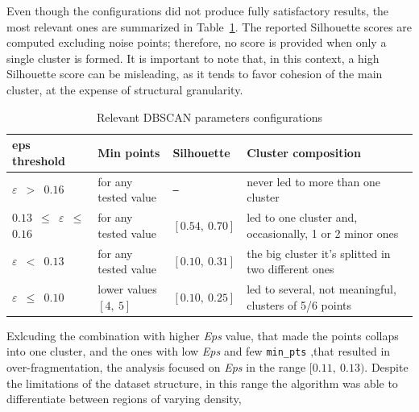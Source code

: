 
Even though the configurations did not produce fully satisfactory results, the most relevant ones are summarized in Table~\ref{tab:eps}. 
The reported Silhouette scores are computed excluding noise points; therefore, no score is provided when only a single cluster is formed. 
It is important to note that, in this context, a high Silhouette score can be misleading, as it tends to favor cohesion of the main cluster, at the expense of structural granularity. 
\begin{table}[h]
\centering
\begin{tabular}{llll}
\toprule
\textbf{eps threshold} & \textbf{Min points} & \textbf{Silhouette} & \textbf{Cluster composition}  \\
\midrule
\texttt{\textbf{$\varepsilon$} $>$ $0.16$} & for any tested value & \texttt{---} & never led to more than one cluster \\
\texttt{$0.13$ $\leq$ \textbf{$\varepsilon$} $\leq$ $0.16$} & for any tested value &  $[0.54,\ 0.70]$  & led to one cluster and, occasionally, 1 or 2 minor ones\\
\texttt{\textbf{$\varepsilon$} $<$ $0.13$}& for any tested value & $[0.10,\ 0.31]$ & the big cluster it's splitted in two different ones \\
\texttt{\textbf{$\varepsilon$} $\leq$ $0.10$} & lower values $[4,\ 5]$& $[0.10,\ 0.25]$  & led to several, not meaningful, clusters of 5/6 points\\
\bottomrule
\end{tabular}
\caption{Relevant DBSCAN parameters configurations}
\label{tab:eps}
\end{table}



Exlcuding the combination with higher \textit{Eps} value, that made the points collaps into one cluster, and the ones with low \textit{Eps} and few \texttt{min\_pts} ,that resulted in over-fragmentation, 
the analysis focused on \textit{Eps} in the range $[0.11,\ 0.13)$.
Despite the limitations of the dataset structure, in this range the algorithm was able to differentiate between regions of varying density, 

